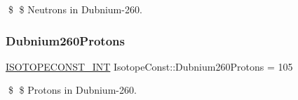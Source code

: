\$ \$ Neutrons in Dubnium-\/260. \mbox{\label{group___isotope_const-_dubnium-_db260_ga1aa3e99481a9e5d966213867be747bcb}} 
\subsubsection{\texorpdfstring{Dubnium260\+Protons}{Dubnium260Protons}}
{\footnotesize\ttfamily \mbox{\hyperlink{group___isotope_const-_macros_ga5f18360b3e99483a35c32d789e62621c}{I\+S\+O\+T\+O\+P\+E\+C\+O\+N\+S\+T\+\_\+\+I\+NT}} Isotope\+Const\+::\+Dubnium260\+Protons = 105}

\$ \$ Protons in Dubnium-\/260. 